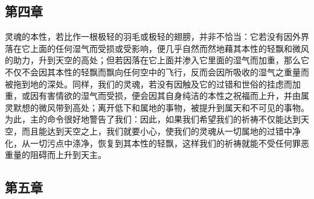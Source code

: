 
\subsection{第四章}

\par

灵魂的本性，若比作一根极轻的羽毛或极轻的翅膀，并非不恰当：它若没有因外界落在它上面的任何湿气而受损或受影响，便几乎自然而然地藉其本性的轻飘和微风的助力，升到天空的高处；但若因落在它上面并渗入它里面的湿气而加重，那么它不仅不会因其本性的轻飘而飘向任何空中的飞行，反而会因所吸收的湿气之重量而被拖到地的深处。同样，我们的灵魂，若没有因触及它的过错和世俗的挂虑而加重，或因有害情欲的湿气而受损，便会因其自身纯洁的本性之祝福而上升，并由属灵默想的微风带到高处；离开低下和属地的事物，被提升到属天和不可见的事物。为此，主的命令很好地警告了我们：因此，如果我们希望我们的祈祷不仅能达到天空，而且能达到天空之上，我们就要小心，使我们的灵魂从一切属地的过错中净化，从一切污点中涤净，恢复到其本性的轻飘，这样我们的祈祷就能不受任何罪恶重量的阻碍而上升到天主。\par


\subsection{第五章}

\par

